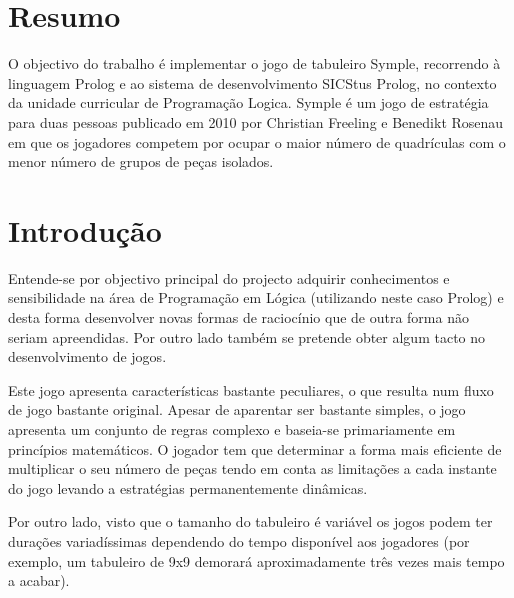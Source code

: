 \documentclass[a4paper]{article}
\begin{document}
\newpage

\section*{Resumo}
O objectivo do trabalho é implementar o jogo de tabuleiro Symple, recorrendo à linguagem Prolog e ao sistema de desenvolvimento SICStus Prolog,  no contexto da unidade curricular de Programação Logica.
Symple é um jogo de estratégia para duas pessoas publicado em 2010 por Christian Freeling e Benedikt Rosenau em que os jogadores competem por ocupar o maior número de quadrículas com o menor número de grupos de peças isolados. 

\newpage

\tableofcontents



\newpage

\section{Introdução}
Entende-se por objectivo principal do projecto adquirir conhecimentos e sensibilidade na área de Programação em Lógica (utilizando neste caso Prolog) e desta forma desenvolver novas formas de raciocínio que de outra forma não seriam apreendidas. Por outro lado também se pretende obter algum tacto no desenvolvimento de jogos.

Este jogo apresenta características bastante peculiares, o que resulta num fluxo de jogo bastante original. Apesar de aparentar ser bastante simples, o jogo apresenta um conjunto de regras complexo e baseia-se primariamente em princípios matemáticos. O jogador tem que determinar a forma mais eficiente de multiplicar o seu número de peças tendo em conta as limitações a cada instante do jogo levando a estratégias permanentemente dinâmicas.

Por outro lado, visto que o tamanho do tabuleiro é variável os jogos podem ter durações variadíssimas dependendo do tempo disponível aos jogadores (por exemplo, um tabuleiro de 9x9 demorará aproximadamente três vezes mais tempo a acabar).
\end{document}
